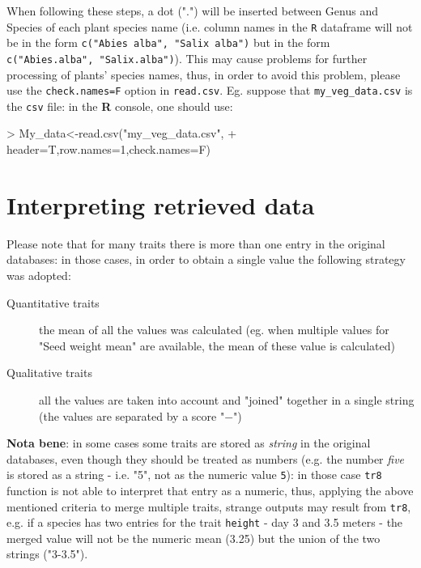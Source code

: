 \documentclass{article}
\begin{document}
  When following these steps, a dot (".") will be inserted between
Genus and Species of each plant species name (i.e. column names in the
\texttt{R} dataframe will not be in the form \texttt{c("Abies alba", "Salix
alba")} but in the form  \texttt{c("Abies.alba", "Salix.alba")}).
This may cause problems for further processing of plants'
species names, thus, in order to avoid this problem, please use the \texttt{check.names=F}
  option in \texttt{read.csv}. Eg. suppose that
  \texttt{my\_veg\_data.csv} is the \texttt{csv} file: in the
  \textbf{R} console, one should use:

\begin{Schunk}
\begin{Sinput}
> My_data<-read.csv("my_veg_data.csv",
+                   header=T,row.names=1,check.names=F)
\end{Sinput}
\end{Schunk}


\section{Interpreting retrieved data}
\label{sec:interpreting}

Please note that for many traits there is more than one entry in the
original databases: in those cases, in order to obtain a single value
the following strategy was adopted:

\begin{description}
\item[Quantitative traits] the mean of all the values was calculated
  (eg. when multiple values for "Seed weight mean" are available, the
  mean of these value is calculated)
\item[Qualitative traits] all the values are taken into account and
  "joined" together in a single string (the values are separated by a
  score "$-$")
\end{description}

\textbf{Nota bene}: in some cases some traits are stored as \textit{string} in the original databases, even though they should be treated as numbers (e.g. the number \textit{five} is stored as a string - i.e. "5", not as the numeric value \texttt{5}): in those case \texttt{tr8} function is not able to interpret that entry as a numeric, thus, applying the above mentioned criteria to merge multiple traits, strange outputs may result from \texttt{tr8}, e.g. if a species has two entries for the trait \texttt{height} - day 3 and 3.5 meters - the merged value will not be the numeric mean (3.25) but the union of the two strings ("3-3.5").
\end{document}
